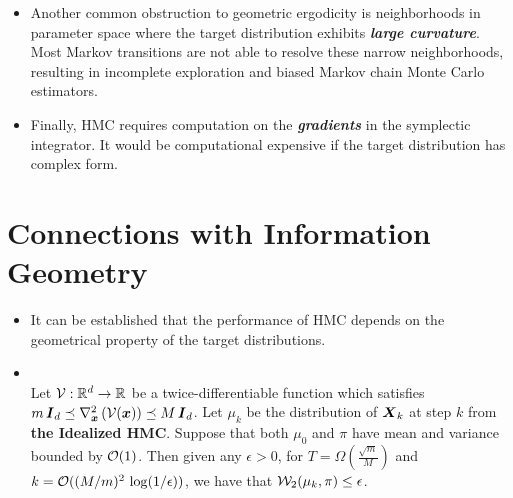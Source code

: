 \documentclass[11pt]{article}
\begin{document}
\begin{itemize}
\begin{itemize}
\item Another common obstruction to geometric ergodicity is neighborhoods in parameter space where the target distribution exhibits \emph{\textbf{large curvature}}. Most Markov transitions are not able to resolve these narrow neighborhoods, resulting in incomplete exploration and biased Markov chain Monte Carlo estimators. 

\item Finally, HMC requires computation on the \emph{\textbf{gradients}} in the symplectic integrator. It would be computational expensive if the target distribution has complex form.
\end{itemize}
\end{itemize}



\section{Connections with Information Geometry}
\begin{itemize}
\item It can be established that the performance of HMC depends on the geometrical property of the target distributions. 

\item \begin{theorem} \citep{vishnoi2021introduction}\\
Let ${\mathcal V}: {\mathbb R}^d \rightarrow {\mathbb R}$  be a twice-differentiable function which satisfies $m\,\boldsymbol{I}_{d} \preceq \nabla^2_{\boldsymbol{x}}\left({\mathcal V}(\boldsymbol{x})\right) \preceq M\,\boldsymbol{I}_{d}$. Let $\mu_k$ be the distribution of $\boldsymbol{X}_{k}$ at step $k$ from \textbf{the Idealized HMC}. Suppose that both $\mu_{0}$
and $\pi$ have mean and variance bounded by ${\mathcal O}(1)$. Then given any $\epsilon > 0$, for $T = \Omega(\frac{\sqrt{m}}{M})$ and $k = {\mathcal O}((M/m)^2\, \log(1/\epsilon))$, we have that ${\mathcal W}_{2}(\mu_{k},\pi) \le \epsilon$. 
\end{theorem}
\end{itemize}



\newpage


\end{document}
